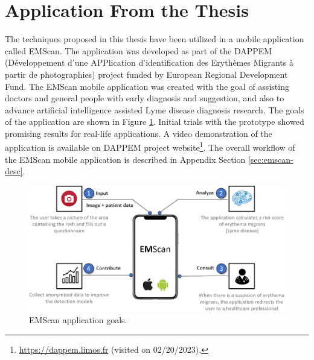 \section{Application From the Thesis}\label{sec:in_progress_application}
The techniques proposed in this thesis have been utilized in a mobile application called EMScan. The application was developed as part of the DAPPEM (Développement d’une APPlication d’identification des Erythèmes Migrants à partir de photographies) project funded by European Regional Development Fund. The EMScan mobile application was created with the goal of assisting doctors and general people with early diagnosis and suggestion, and also to advance artificial intelligence assisted Lyme disease diagnosis research. The goals of the application are shown in Figure \ref{EMScan}. Initial trials with the prototype showed promising results for real-life applications. A video demonstration of the application is available on DAPPEM project website\footnote{\url{https://dappem.limos.fr} (visited on 02/20/2023).}. The overall workflow of the EMScan mobile application is described in Appendix Section  \ref{sec:emscan-desc}.
\begin{figure}[htb!]
	\begin{center}
		\includegraphics[width=\textwidth,keepaspectratio]{images/ongoing/EMScan.png}
		\caption{EMScan application goals.} \label{EMScan}
	\end{center}
\end{figure}

